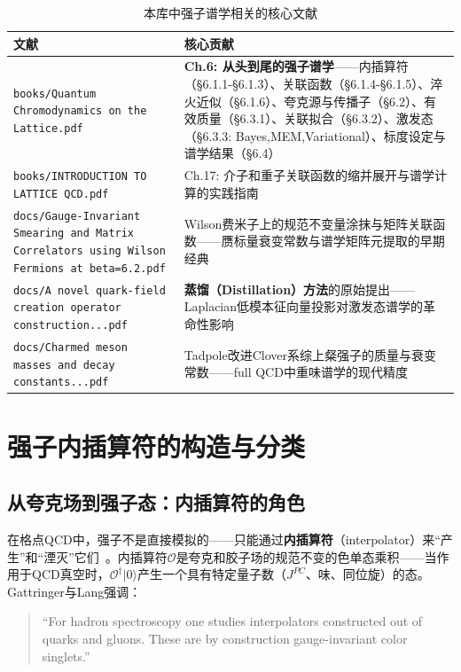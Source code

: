 \documentclass[12pt,a4paper]{ctexart}
\theoremstyle{definition}
\begin{document}
\begin{table}[H]
\centering
\caption{本库中强子谱学相关的核心文献}
\label{tab:spec_papers}
\small
\begin{tabular}{lp{9cm}}
\toprule
文献 & 核心贡献 \\
\midrule
\texttt{books/Quantum Chromodynamics on the Lattice.pdf}~\cite{GattringerLang2010} & \textbf{Ch.6: 从头到尾的强子谱学}——内插算符（§6.1.1-§6.1.3）、关联函数（§6.1.4-§6.1.5）、淬火近似（§6.1.6）、夸克源与传播子（§6.2）、有效质量（§6.3.1）、关联拟合（§6.3.2）、激发态（§6.3.3: Bayes,MEM,Variational）、标度设定与谱学结果（§6.4）\\
\texttt{books/INTRODUCTION TO LATTICE QCD.pdf}~\cite{Gupta1997intro} & Ch.17: 介子和重子关联函数的缩并展开与谱学计算的实践指南 \\
\texttt{docs/Gauge-Invariant Smearing and Matrix Correlators using Wilson Fermions at beta=6.2.pdf} & Wilson费米子上的规范不变量涂抹与矩阵关联函数——赝标量衰变常数与谱学矩阵元提取的早期经典 \\
\texttt{docs/A novel quark-field creation operator construction...pdf} & \textbf{蒸馏（Distillation）方法}的原始提出——Laplacian低模本征向量投影对激发态谱学的革命性影响 \\
\texttt{docs/Charmed meson masses and decay constants...pdf}~\cite{CharmedClover} & Tadpole改进Clover系综上粲强子的质量与衰变常数——full QCD中重味谱学的现代精度 \\
\bottomrule
\end{tabular}
\end{table}

\section{强子内插算符的构造与分类}

\subsection{从夸克场到强子态：内插算符的角色}

在格点QCD中，强子不是直接模拟的——只能通过\textbf{内插算符}（interpolator）来``产生''和``湮灭''它们~\cite{GattringerLang2010}。内插算符$\mathcal{O}$是夸克和胶子场的规范不变的色单态乘积——当作用于QCD真空时，$\mathcal{O}^\dagger|0\rangle$产生一个具有特定量子数（$J^{PC}$、味、同位旋）的态。Gattringer与Lang强调：
\begin{quote}
``For hadron spectroscopy one studies interpolators constructed out of quarks and gluons. These are by construction gauge-invariant color singlets.''~\cite{GattringerLang2010}
\end{quote}
\end{document}
